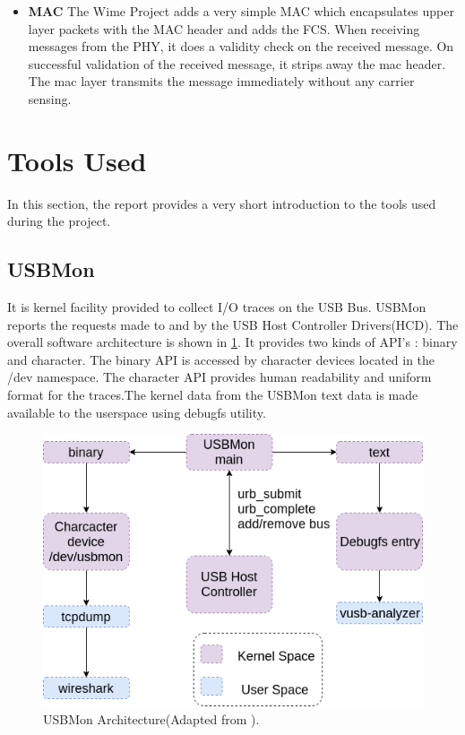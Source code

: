 \begin{itemize}
\item{\textbf{MAC} The Wime Project adds a very simple MAC which encapsulates upper layer packets with the MAC header and adds the \ac{FCS}.
When receiving messages from the \ac{PHY}, it does a validity check on the received message.
On successful validation of the received message, it strips away the \ac{mac} header.
The \ac{mac} layer transmits the message immediately without any carrier sensing.}
\end{itemize}

\section{Tools Used}
In this section, the report provides a very short introduction to the tools used during the project. 

\subsection{USBMon}
It is kernel facility provided to collect I/O traces on the USB Bus\cite{_usbmon}. USBMon reports the requests made to and by the USB Host Controller Drivers(HCD).
The overall software architecture is shown in \ref{usbmon_arch}.
It provides two kinds of API's : binary and character. The binary API is accessed by character devices located in the /dev namespace. The character API provides human readability and uniform format for the traces.The kernel data from the USBMon text data is made available to the userspace using debugfs\cite{_debugfs} utility.

\begin{figure}[h!]
\centering
\includegraphics[width=\textwidth]{Figure/USBMon.png}
\caption{USBMon Architecture(Adapted from \cite{basak_usb_2018}).}
\label{usbmon_arch}
\end{figure}


